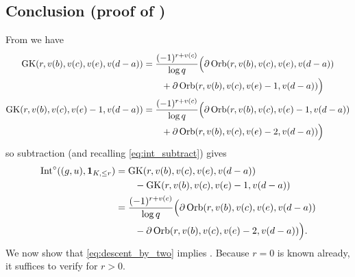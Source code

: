 \subsection{Conclusion (proof of )}
From  we have
\begin{align*}
  \operatorname{GK}(r, v(b), v(c), v(e), v(d-a))
  &= \frac{(-1)^{r+v(c)}}{\log q} \Big(
      \partial \operatorname{Orb}(r, v(b), v(c), v(e), v(d-a)) \\
      &\qquad + \partial \operatorname{Orb}(r, v(b), v(c), v(e)-1, v(d-a))
    \Big) \\
  \operatorname{GK}(r, v(b), v(c), v(e)-1, v(d-a))
  &= \frac{(-1)^{r+v(c)}}{\log q} \Big(
      \partial \operatorname{Orb}(r, v(b), v(c), v(e)-1, v(d-a)) \\
      &\qquad + \partial \operatorname{Orb}(r, v(b), v(c), v(e)-2, v(d-a))
    \Big)
\end{align*}
so subtraction (and recalling \eqref{eq:int_subtract}) gives
\begin{equation}
  \begin{aligned}
    \operatorname{Int}^\circ((g,u), \mathbf{1}_{K, \le r})
    &= \operatorname{GK}(r, v(b), v(c), v(e), v(d-a)) \\
    &\qquad- \operatorname{GK}(r, v(b), v(c), v(e)-1, v(d-a)) \\
    &= \frac{(-1)^{r+v(c)}}{\log q} \Big(
        \partial \operatorname{Orb}(r, v(b), v(c), v(e), v(d-a)) \\
        &\qquad- \partial \operatorname{Orb}(r, v(b), v(c), v(e)-2, v(d-a))
      \Big).
  \end{aligned}
  \label{eq:descent_by_two}
\end{equation}
We now show that \eqref{eq:descent_by_two} implies .
Because $r = 0$ is known already, it suffices to verify for $r > 0$.

